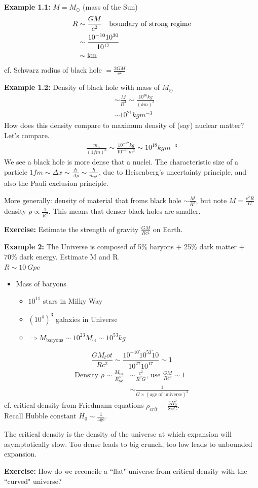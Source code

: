 \documentclass[a4paper]{article} %
\newcommand{\exercise}[1]
{
\begin{framed}
\textbf{Exercise:} #1 
\end{framed}
}
\newcommand{\example}[2]
{
\begin{framed}
\textbf{Example #1:} #2
\end{framed}
}
\begin{document}
\example{1.1}{
$M=M_{\odot}$ (mass of the Sun)
\begin{align*}
R & \sim \frac{GM}{c^2} \text{\quad boundary of strong regime}\\
&\sim \frac{10^{-10}10^{30}}{10^{17}}\\
&\sim \text{km}
\end{align*}
cf. Schwarz radius of black hole $=\frac{2GM}{c^2}$
}
\example{1.2}{
Density of black hole with mass of $M_\odot$
\begin{align*}
&\sim \frac{M}{R^3}\sim\frac{10^{30}kg}{(km)^3}\\
&\sim 10^{21}kgm^{-3}
\end{align*}
How does this density compare to maximum density of (say) nuclear matter? Let's compare.
\begin{align*}
\frac{m_n}{(1fm)^3}\sim \frac{10^{-27}kg}{10^{-45}m^3}\sim 10^{18}kgm^{-3}
\end{align*}
We see a black hole is more dense that a nuclei. The characteristic size of a particle $1fm\sim\Delta x\sim \frac{\hbar}{\Delta p}\sim \frac{\hbar}{m_n c}$, due to Heisenberg's uncertainty principle, and also the Pauli exclusion principle.
}
More generally: density of material that froms black hole $\sim\frac{M}{R^3}$, but note $M=\frac{c^2R}{G}$ density $\rho \propto \frac{1}{R^2}$. This means that denser black holes are smaller.

\exercise{Estimate the strength of gravity $\frac{GM}{Rc^2}$ on Earth.}

\example{2}
{
The Universe is composed of 5\% baryons + 25\% dark matter + 70\% dark energy. Estimate M and R.\\
$R\sim \SI{10}{Gpc}$
\begin{itemize}
\item Mass of baryons 
\begin{itemize}
\item $10^{11}$ stars in Milky Way
\item $(10^4)^3$ galaxies in Universe
\item $\Rightarrow M_{\text{baryons}}\sim10^{23}M_\odot\sim 10^{53}kg$
\end{itemize}
\end{itemize} 
\begin{equation}
\frac{GM_tot}{Rc^2}\sim\frac{10^{-10}\dot 10^{53}\dot 10}{10^{27} \dot 10^{17}}\sim 1
\end{equation}
\begin{align*}
\text{Density }\rho\sim\frac{M_{tot}}{R_{tot}^3}&\sim\frac{c^2}{R^2G}\text{, use }\frac{GM}{Rc^2}\sim 1\\
&\sim\frac{1}{G\times(\text{age of universe})^2}
\end{align*}
cf. critical density from Friedmann equations $\rho_{crit}=\frac{3H_0^2}{8\pi G}$.\\
Recall Hubble constant $H_0\sim \frac{1}{\text{age}}$.
}
The critical density is the density of the universe at which expansion will asymptotically slow. Too dense leads to big crunch, too low leads to unbounded expansion.
\exercise{How do we reconcile a ``flat" universe from critical density with the ``curved" universe?}




\pagebreak

\end{document}
